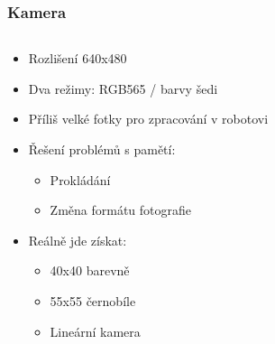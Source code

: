 \documentclass{beamer}
\begin{document}
\begin{frame}
    \frametitle{Kamera}
    \begin{columns}
        \begin{column}{.7\textwidth}
            \begin{itemize}
                \item Rozlišení 640x480
                \item Dva režimy: RGB565 / barvy šedi
                \item Příliš velké fotky pro zpracování v robotovi
                \item Řešení problémů s pamětí:
                    \begin{itemize}
                        \item Prokládání
                        \item Změna formátu fotografie
                    \end{itemize}
                \item Reálně jde získat:
                    \begin{itemize}
                        \item 40x40 barevně
                        \item 55x55 černobíle
                        \item Lineární kamera
                    \end{itemize}
            \end{itemize}
        \end{column}


\end{columns}
\end{frame}
\end{document}
